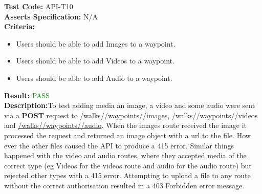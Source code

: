 \documentclass[11pt,a4paper]{report}
\begin{document}
\label{test:API-T10}
\noindent\textbf{Test Code:} API-T10\\
\textbf{Asserts Specification:} N/A \\ 
\textbf{Criteria:} \begin{itemize}
                     \item Users should be able to add Images to a waypoint.
                     \item Users should be able to add Videos to a waypoint.
                     \item Users should be able to add Audio to a waypoint.
                   \end{itemize}  
\textbf{Result:} \textcolor{green}{PASS}\\ 
\textbf{Description:}To test adding media an image, a video and some audio were sent via a \textbf{POST} request to \url{/walks/}\url{/waypoints/}\url{/images}, \url{/walks/}\url{/waypoints/}\url{/videos} and \url{/walks/}\url{/waypoints/}\url{/audio}. When the images route received the image it processed the request and returned an image object with a url to the file. How ever the other files caused the API to produce a 415 error. Similar things happened with the video and audio routes, where they accepted media of the correct type (eg Videos for the videos route and audio for the audio route) but rejected other types with a 415 error. Attempting to upload a file to any route without the correct authorisation resulted in a 403 Forbidden error message. 
\end{document}
